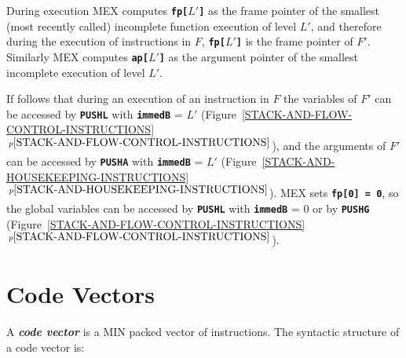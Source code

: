 \documentclass[12pt]{article}
\newcommand{\TT}[1]{{\tt \bfseries #1}}
\newcommand{\key}[1]{{\bf \em #1}\index{#1}}
\newcommand{\itemref}[1]{\ref{#1}$\,^{p\pageref{#1}}$}
\begin{document}
During execution MEX computes \TT{fp[$L'$]} as the frame pointer
of the smallest (most recently called)
incomplete function execution of level $L'$,
and therefore
during the execution of instructions in $F$, \TT{fp[$L'$]} is the
frame pointer of $F'$.
Similarly MEX computes \TT{ap[$L'$]} as the argument pointer of
the smallest incomplete execution of level $L'$.

If follows that during an execution of an instruction in $F$
the variables of $F'$ can be accessed by
\TT{PUSHL} with \TT{immedB} = $L'$
(Figure~\itemref{STACK-AND-FLOW-CONTROL-INSTRUCTIONS}),
and the arguments of $F'$ can be
accessed by \TT{PUSHA} with \TT{immedB} = $L'$
(Figure~\itemref{STACK-AND-HOUSEKEEPING-INSTRUCTIONS}).
MEX sets \TT{fp[0] = 0},
so the global variables can be accessed by \TT{PUSHL} with \TT{immedB} = $0$
or by \TT{PUSHG}
(Figure~\itemref{STACK-AND-FLOW-CONTROL-INSTRUCTIONS}).

\section{Code Vectors}
\label{CODE-VECTORS}

A \key{code vector} is a MIN packed vector of instructions.
The syntactic structure of a code vector is:
\end{document}
